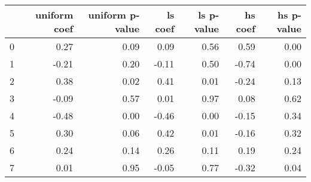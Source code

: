 \begin{tabular}{lrrrrrr}
\toprule
 & uniform coef & uniform p-value & ls coef & ls p-value & hs coef & hs p-value \\
\midrule
0 & 0.27 & 0.09 & 0.09 & 0.56 & 0.59 & 0.00 \\
1 & -0.21 & 0.20 & -0.11 & 0.50 & -0.74 & 0.00 \\
2 & 0.38 & 0.02 & 0.41 & 0.01 & -0.24 & 0.13 \\
3 & -0.09 & 0.57 & 0.01 & 0.97 & 0.08 & 0.62 \\
4 & -0.48 & 0.00 & -0.46 & 0.00 & -0.15 & 0.34 \\
5 & 0.30 & 0.06 & 0.42 & 0.01 & -0.16 & 0.32 \\
6 & 0.24 & 0.14 & 0.26 & 0.11 & 0.19 & 0.24 \\
7 & 0.01 & 0.95 & -0.05 & 0.77 & -0.32 & 0.04 \\
\bottomrule
\end{tabular}
